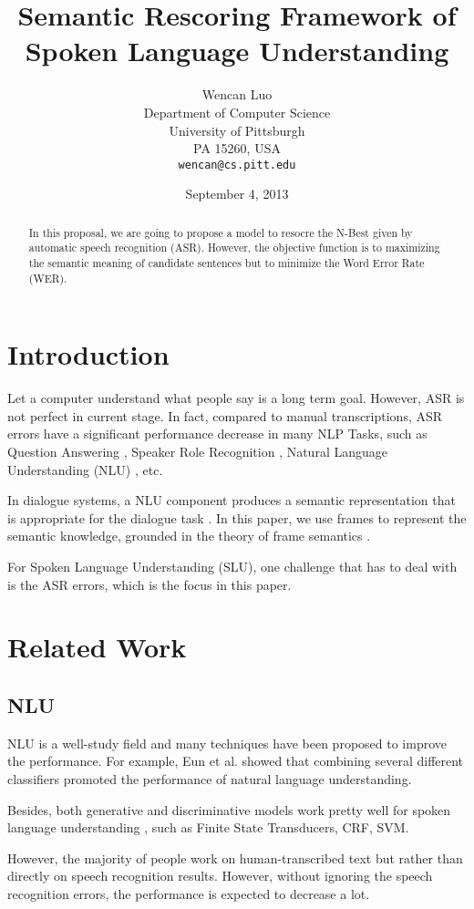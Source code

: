 \documentclass[11pt,letterpaper]{article}
\title{Semantic Rescoring Framework of Spoken Language Understanding}
\author{Wencan Luo\\
	    Department of Computer Science\\
	    University of Pittsburgh\\
	    PA 15260, USA\\
	    {\tt wencan@cs.pitt.edu}
	  }
\date{September 4, 2013}
\begin{document}
\maketitle
\begin{abstract}
In this proposal, we are going to propose a model to resocre the N-Best given by automatic speech recognition (ASR).
However, the objective function is to maximizing the semantic meaning of candidate sentences but to minimize the Word Error Rate (WER).

\end{abstract}

\section{Introduction}
Let a computer understand what people say is a long term goal. However, ASR is not perfect in current stage. 
In fact, compared to manual transcriptions, ASR errors have a significant performance decrease in many NLP Tasks, such as Question Answering \cite{Turmo:2007}, Speaker Role Recognition \cite{Garg:2008}, Natural Language Understanding (NLU) \cite{Raymond:2007}, etc.

In dialogue systems, a NLU component produces a semantic representation that is appropriate for the dialogue task \cite{Jurafsky:2000}. In this paper, we use frames to represent the semantic knowledge, grounded in the theory of frame semantics \cite{Fillmore:1982}.

For Spoken Language Understanding (SLU), one challenge that has to deal with is the ASR errors, which is the focus in this paper.

\section{Related Work}
\subsection{NLU}

NLU is a well-study field and many techniques have been proposed to improve the performance. For example, Eun et al. showed that combining several different classifiers promoted the performance of natural language understanding. 
 
Besides, both generative and discriminative models work pretty well for spoken language understanding \cite{Raymond:2007}, such as Finite State Transducers, CRF, SVM.
 
However, the majority of people work on human-transcribed text but rather than directly on speech recognition results. However, without ignoring the speech recognition errors, the performance is expected to decrease a lot. 
\end{document}
